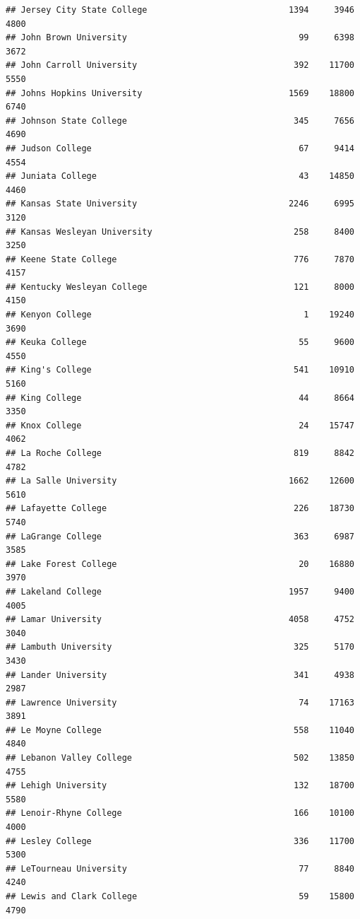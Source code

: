 \documentclass[
]{article}
\begin{document}
\begin{verbatim}
## Jersey City State College                            1394     3946       4800
## John Brown University                                  99     6398       3672
## John Carroll University                               392    11700       5550
## Johns Hopkins University                             1569    18800       6740
## Johnson State College                                 345     7656       4690
## Judson College                                         67     9414       4554
## Juniata College                                        43    14850       4460
## Kansas State University                              2246     6995       3120
## Kansas Wesleyan University                            258     8400       3250
## Keene State College                                   776     7870       4157
## Kentucky Wesleyan College                             121     8000       4150
## Kenyon College                                          1    19240       3690
## Keuka College                                          55     9600       4550
## King's College                                        541    10910       5160
## King College                                           44     8664       3350
## Knox College                                           24    15747       4062
## La Roche College                                      819     8842       4782
## La Salle University                                  1662    12600       5610
## Lafayette College                                     226    18730       5740
## LaGrange College                                      363     6987       3585
## Lake Forest College                                    20    16880       3970
## Lakeland College                                     1957     9400       4005
## Lamar University                                     4058     4752       3040
## Lambuth University                                    325     5170       3430
## Lander University                                     341     4938       2987
## Lawrence University                                    74    17163       3891
## Le Moyne College                                      558    11040       4840
## Lebanon Valley College                                502    13850       4755
## Lehigh University                                     132    18700       5580
## Lenoir-Rhyne College                                  166    10100       4000
## Lesley College                                        336    11700       5300
## LeTourneau University                                  77     8840       4240
## Lewis and Clark College                                59    15800       4790

\end{verbatim}
\end{document}
